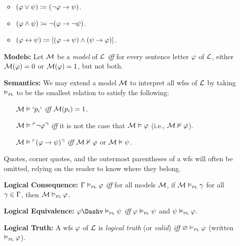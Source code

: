 \documentclass[a4paper, 11pt]{article} %
\begin{document}
\begin{enumerate}[leftmargin=1.2in,labelsep=.15in]
    \begin{itemize}\small
      \item $(\varphi \vee \psi) \coloneq (\neg \varphi \rightarrow \psi)$.
      \item $(\varphi\wedge \psi) \coloneq \neg(\varphi \rightarrow \neg\psi)$.
      \item $(\varphi\leftrightarrow \psi) \coloneq [(\varphi\rightarrow \psi)\wedge(\psi\rightarrow \varphi)]$.
    \end{itemize}
  \item[\bf Models:] Let $\mathcal{M}$ be a \textit{model} of $\mathcal{L}$ \textit{iff} for every sentence letter $\varphi$ of $\mathcal{L}$, either $\mathcal{M}(\varphi)=0$ or $\mathcal{M}(\varphi)=1$, but not both.
  \item[\bf Semantics:] We may extend a model $\mathcal{M}$ to interpret all wfss of $\mathcal{L}$ by taking $\vDash_{\textsc{pl}}$ to be the smallest relation to satisfy the following:
    \begin{itemize}[leftmargin=.15in]\small
      \item[] $\mathcal{M}\vDash `p_i`$ \textit{iff} $\mathcal{M}(p_i)=1$.
      \item[] $\mathcal{M}\vDash \ulcorner\neg \varphi\urcorner$ \textit{iff} it is not the case that $\mathcal{M}\vDash \varphi$ (i.e., $\mathcal{M}\nvDash \varphi$). %
      \item[] $\mathcal{M}\vDash \ulcorner(\varphi \rightarrow \psi)\urcorner$ \textit{iff} $\mathcal{M}\nvDash \varphi$ or $\mathcal{M}\vDash \psi$.
    \end{itemize}
  Quotes, corner quotes, and the outermost parentheses of a wfs will often be omitted, relying on the reader to know where they belong.
  \item[\bf Logical Consequence:] $\Gamma \vDash_{\textsc{pl}} \varphi$ \textit{iff} for all models $\mathcal{M}$, if $\mathcal{M}\vDash_{\textsc{pl}} \gamma$ for all $\gamma\in\Gamma$, then $\mathcal{M}\vDash_{\textsc{pl}} \varphi$.
  \item[\bf Logical Equivalence:] $\metaA \Dashv\PLmodels \metaB$ \textit{iff} $\varphi\vDash_{\textsc{pl}} \psi$ and $\psi\vDash_{\textsc{pl}} \varphi$.  
  \item[\bf Logical Truth:] A wfs $\varphi$ of $\mathcal{L}$ is \textit{logical truth} (or \textit{valid}) \textit{iff} $\varnothing\vDash_{\textsc{pl}} \varphi$ (written $\vDash_{\textsc{pl}} \varphi$).
\end{enumerate}
\end{document}

